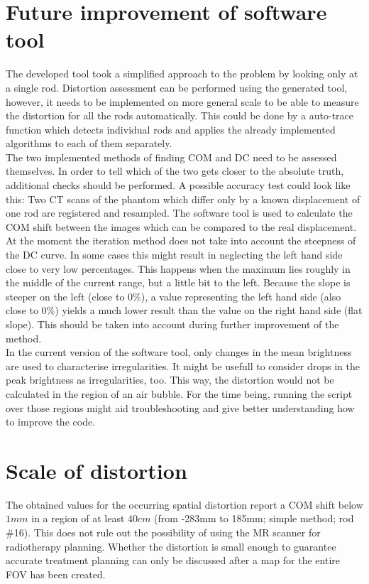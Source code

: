     
\section{Future improvement of software tool}

The developed tool took a simplified approach to the problem by looking only at a single rod.
Distortion assessment can be performed using the generated tool, however, it needs to be implemented on more general scale to be able to measure the distortion for all the rods automatically.
This could be done by a auto-trace function which detects individual rods and applies the already implemented algorithms to each of them separately.\\

The two implemented methods of finding COM and DC need to be assessed themselves.
In order to tell which of the two gets closer to the absolute truth, additional checks should be performed.
A possible accuracy test could look like this:
Two CT scans of the phantom which differ only by a known displacement of one rod are registered and resampled.
The software tool is used to calculate the COM shift between the images which can be compared to the real displacement.\\

At the moment the iteration method does not take into account the steepness of the DC curve.
In some cases this might result in neglecting the left hand side close to very low percentages.
This happens when the maximum lies roughly in the middle of the current range, but a little bit to the left.
Because the slope is steeper on the left (close to 0\%), a value representing the left hand side (also close to 0\%) yields a much lower result than the value on the right hand side (flat slope).
This should be taken into account during further improvement of the method.\\

In the current version of the software tool, only changes in the mean brightness are used to characterise irregularities.
It might be usefull to consider drops in the peak brightness as irregularities, too.
This way, the distortion would not be calculated in the region of an air bubble.
For the time being, running the script over those regions might aid troubleshooting and give better understanding how to improve the code.\\


\section{Scale of distortion}

The obtained values for the occurring spatial distortion report a COM shift below $1mm$ in a region of at least $40cm$ (from -283mm to 185mm; simple method; rod \#16).
This does not rule out the possibility of using the MR scanner for radiotherapy planning.
Whether the distortion is small enough to guarantee accurate treatment planning can only be discussed after a map for the entire FOV has been created.



